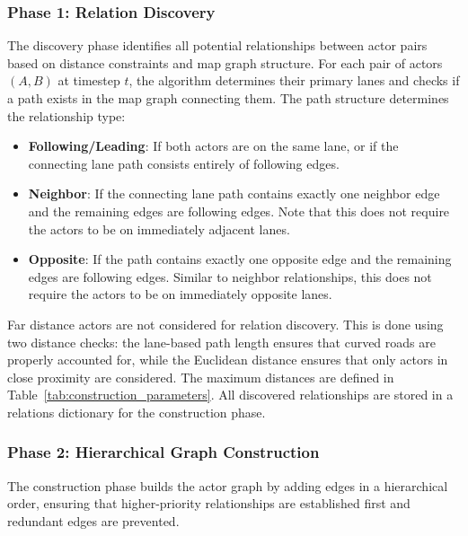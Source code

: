 \subsubsection{Phase 1: Relation Discovery}
\label{subsubsec:discovery_phase}

The discovery phase identifies all potential relationships between actor pairs based on distance 
constraints and map graph structure. For each pair of actors $(A, B)$ at timestep $t$, the 
algorithm determines their primary lanes and checks if a path exists in the map graph connecting 
them. The path structure determines the relationship type:

\begin{itemize}
    \item \textbf{Following/Leading}: If both actors are on the same lane, or if the connecting lane path consists 
          entirely of following edges.
    
    \item \textbf{Neighbor}: If the connecting lane path contains exactly one neighbor edge and the remaining edges 
          are following edges. Note that this does not require the actors to be on immediately 
          adjacent lanes. 
    
    \item \textbf{Opposite}: If the path contains exactly one opposite edge and the remaining edges 
          are following edges. Similar to neighbor relationships, this does not require the actors 
          to be on immediately opposite lanes.
\end{itemize}

Far distance actors are not considered for relation discovery. This is done using two distance checks: 
the lane-based path length ensures that 
curved roads are properly accounted for, while the Euclidean distance ensures that only actors in 
close proximity are considered. The maximum distances are defined in Table~\ref{tab:construction_parameters}. 
All discovered relationships are stored in a relations dictionary 
for the construction phase.

\subsubsection{Phase 2: Hierarchical Graph Construction}
\label{subsubsec:construction_phase}

The construction phase builds the actor graph by adding edges in a hierarchical order, ensuring 
that higher-priority relationships are established first and redundant edges are prevented.

